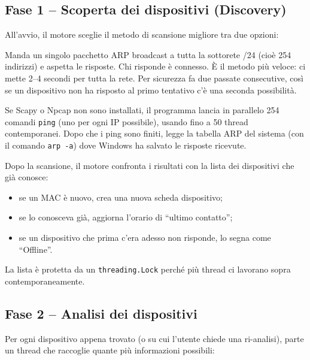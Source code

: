 \documentclass[a4paper,11pt]{article}
\begin{document}
\subsection{Fase 1 -- Scoperta dei dispositivi (Discovery)}

All'avvio, il motore sceglie il metodo di scansione migliore
tra due opzioni:

\begin{description}[style=nextline, leftmargin=2.5cm]
  \item[Metodo ARP (Scapy)]
    Manda un singolo pacchetto ARP broadcast a tutta la sottorete
    /24 (cioè 254 indirizzi) e aspetta le risposte.
    Chi risponde è connesso.  È il metodo più veloce: ci mette
    2--4 secondi per tutta la rete.  Per sicurezza fa due passate
    consecutive, così se un dispositivo non ha risposto al primo
    tentativo c'è una seconda possibilità.

  \item[Metodo Fallback (Ping + ARP)]
    Se Scapy o Npcap non sono installati, il programma lancia
    in parallelo 254 comandi \texttt{ping} (uno per ogni IP
    possibile), usando fino a 50 thread contemporanei.  Dopo
    che i ping sono finiti, legge la tabella ARP del sistema
    (con il comando \texttt{arp~-a}) dove Windows ha salvato
    le risposte ricevute.
\end{description}

Dopo la scansione, il motore confronta i risultati con la lista
dei dispositivi che già conosce:
\begin{itemize}[nosep]
  \item se un MAC è nuovo, crea una nuova scheda dispositivo;
  \item se lo conosceva già, aggiorna l'orario di ``ultimo
        contatto'';
  \item se un dispositivo che prima c'era adesso non risponde,
        lo segna come ``Offline''.
\end{itemize}

La lista è protetta da un \texttt{threading.Lock} perché più
thread ci lavorano sopra contemporaneamente.

\subsection{Fase 2 -- Analisi dei dispositivi}

Per ogni dispositivo appena trovato (o su cui l'utente chiede
una ri-analisi), parte un thread che raccoglie quante più
informazioni possibili:
\end{document}
